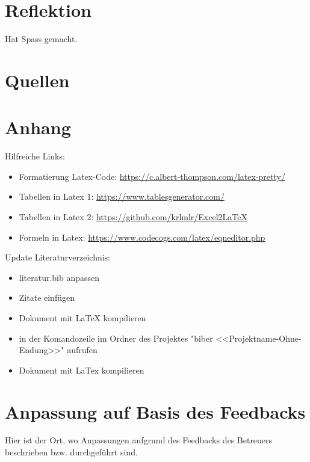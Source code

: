 \documentclass[10pt,a4paper]{article}
\begin{document}
\section{Reflektion}
Hat Spass gemacht. 

\section{Quellen}

\printbibliography

\pagebreak

\section{Anhang}

Hilfreiche Links: 
\begin{itemize}[nosep]
	\item Formatierung Latex-Code: \url{https://c.albert-thompson.com/latex-pretty/}
	\item Tabellen in Latex 1: \url{https://www.tablesgenerator.com/}
	\item Tabellen in Latex 2: \url{https://github.com/krlmlr/Excel2LaTeX}
	\item Formeln in Latex: \url{https://www.codecogs.com/latex/eqneditor.php}
\end{itemize}

\bigskip

Update Literaturverzeichnis:
	 \begin{itemize}[nosep]
  				\item literatur.bib anpassen
  				\item Zitate einfügen
  				\item Dokument mit LaTeX kompilieren
  				\item in der Komandozeile im Ordner des Projektes "biber <<Projektname-Ohne-Endung>>" aufrufen
  				\item Dokument mit LaTex kompilieren 
	\end{itemize}

\pagebreak

\section{Anpassung auf Basis des Feedbacks}

Hier ist der Ort, wo Anpassungen aufgrund des Feedbacks des Betreuers beschrieben bzw. durchgeführt sind.
\end{document}
